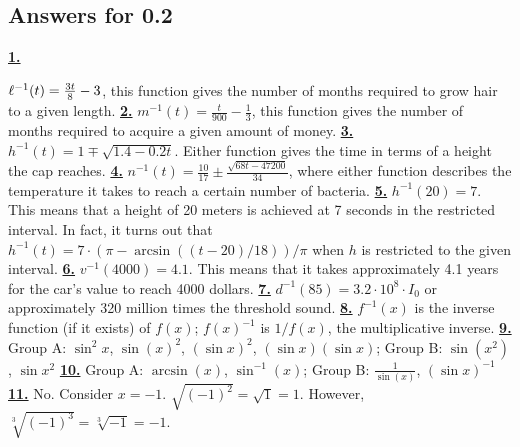 \subsection *{Answers for 0.2}
\hypertarget {a:0.2.1}{\hyperlink {e:0.2.1}{\bfseries 1.}} \mdseries $\ell ^{-1}(t) = \frac {3t}{8} - 3$, this function gives the number of months required to grow hair to a given length.\qquad 
\hypertarget {a:0.2.2}{\hyperlink {e:0.2.2}{\bfseries 2.}} \mdseries $m^{-1}(t) = \frac {t}{900} - \frac {1}{3}$, this function gives the number of months required to acquire a given amount of money.\qquad 
\hypertarget {a:0.2.3}{\hyperlink {e:0.2.3}{\bfseries 3.}} \mdseries $h^{-1}(t) = 1 \mp \sqrt {1.4-0.2t}$. Either function gives the time in terms of a height the cap reaches.\qquad 
\hypertarget {a:0.2.4}{\hyperlink {e:0.2.4}{\bfseries 4.}} \mdseries $n^{-1}(t)= \frac {10}{17} \pm \frac {\sqrt {68t-47200}}{34}$, where either function describes the temperature it takes to reach a certain number of bacteria.\qquad 
\hypertarget {a:0.2.5}{\hyperlink {e:0.2.5}{\bfseries 5.}} \mdseries $h^{-1}(20)=7$. This means that a height of 20 meters is achieved at 7 seconds in the restricted interval. In fact, it turns out that $h^{-1}(t) = 7 \cdot (\pi - \arcsin ((t-20)/18))/\pi $ when $h$ is restricted to the given interval.\qquad 
\hypertarget {a:0.2.6}{\hyperlink {e:0.2.6}{\bfseries 6.}} \mdseries $v^{-1}(4000) = 4.1$. This means that it takes approximately 4.1 years for the car's value to reach 4000 dollars.\qquad 
\hypertarget {a:0.2.7}{\hyperlink {e:0.2.7}{\bfseries 7.}} \mdseries $d^{-1}(85) = 3.2 \cdot 10^{8} \cdot I_0$ or approximately 320 million times the threshold sound.\qquad 
\hypertarget {a:0.2.8}{\hyperlink {e:0.2.8}{\bfseries 8.}} \mdseries $f^{-1}(x)$ is the inverse function (if it exists) of $f(x)$; $f(x)^{-1}$ is $1/f(x)$, the multiplicative inverse.\qquad 
\hypertarget {a:0.2.9}{\hyperlink {e:0.2.9}{\bfseries 9.}} \mdseries Group A: $\sin ^2x$, $\sin (x)^2$, $(\sin x)^2$, $(\sin x)(\sin x)$; Group B: $\sin (x^2)$, $\sin x^2$\qquad 
\hypertarget {a:0.2.10}{\hyperlink {e:0.2.10}{\bfseries 10.}} \mdseries Group A: $\arcsin (x)$, $\sin ^{-1}(x)$; Group B: $\frac {1}{\sin (x)}$, $(\sin x)^{-1}$\qquad 
\hypertarget {a:0.2.11}{\hyperlink {e:0.2.11}{\bfseries 11.}} \mdseries No. Consider $x = -1$. $\sqrt {(-1)^2} = \sqrt {1} = 1$. However, $\sqrt [3]{(-1)^3} = \sqrt [3]{-1} = -1$.\qquad 
